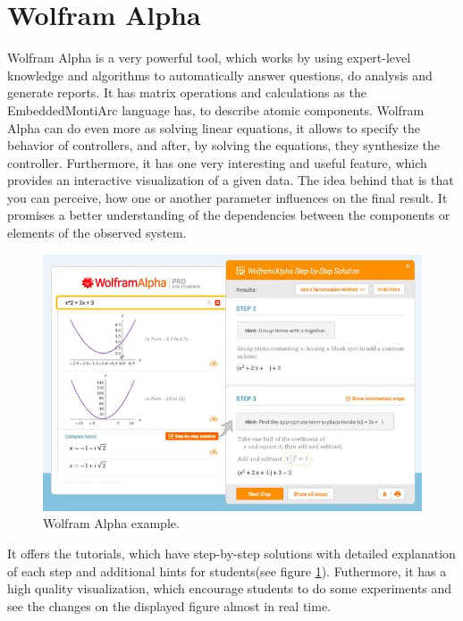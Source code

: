 \section{Wolfram Alpha} \label{sec:wolfram}
Wolfram Alpha \cite{Wolfram} is a very powerful tool, which works by using expert-level knowledge and algorithms to automatically answer questions, do analysis and generate reports. It has matrix operations and calculations as the EmbeddedMontiArc language has, to describe atomic components. Wolfram Alpha can do even more as solving linear equations, it allows to specify the behavior of controllers, and after, by solving the equations, they synthesize the controller. Furthermore, it has one very interesting and useful feature, which provides an interactive visualization of a given data. The idea behind that is that you can perceive, how one or another parameter influences on the final result. It promises a better understanding of the dependencies between the components or elements of the observed system.
\begin{figure}[h!]
    \centering
    \includegraphics[width=0.7\linewidth]{src/pic/wolfram}
    \caption{Wolfram Alpha example.}
    \label{fig:wolfram}
\end{figure}
It offers the tutorials, which have step-by-step solutions with detailed explanation of each step and additional hints for students(see figure \ref{fig:wolfram}). Futhermore, it has a high quality visualization, which encourage students to do some experiments and see the changes on the displayed figure almost in real time.

